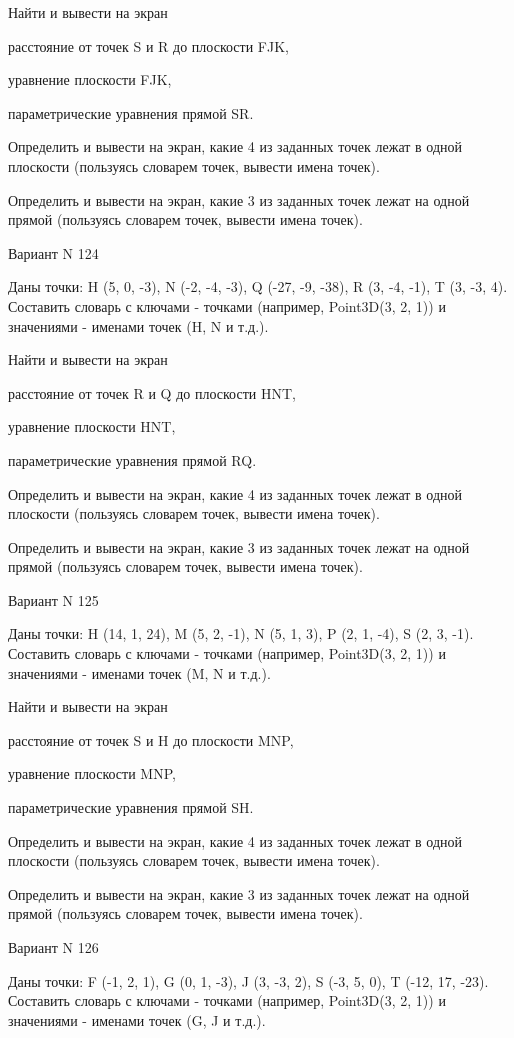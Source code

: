 \documentclass[11pt]{report}
\begin{document}
Найти и вывести на экран


расстояние от точек S и R до плоскости FJK,


уравнение плоскости FJK,


параметрические уравнения прямой SR.


Определить и вывести на экран, какие 4 из заданных точек лежат в одной плоскости (пользуясь словарем точек, вывести имена точек).


Определить и вывести на экран, какие 3 из заданных точек лежат на одной прямой (пользуясь словарем точек, вывести имена точек).

\newpage
Вариант N 124

Даны точки: H (5, 0, -3), N (-2, -4, -3), Q (-27, -9, -38), R (3, -4, -1), T (3, -3, 4).
Составить словарь с ключами - точками (например, Point3D(3, 2, 1)) и значениями - именами точек (H, N и т.д.).


Найти и вывести на экран


расстояние от точек R и Q до плоскости HNT,


уравнение плоскости HNT,


параметрические уравнения прямой RQ.


Определить и вывести на экран, какие 4 из заданных точек лежат в одной плоскости (пользуясь словарем точек, вывести имена точек).


Определить и вывести на экран, какие 3 из заданных точек лежат на одной прямой (пользуясь словарем точек, вывести имена точек).

\newpage
Вариант N 125

Даны точки: H (14, 1, 24), M (5, 2, -1), N (5, 1, 3), P (2, 1, -4), S (2, 3, -1).
Составить словарь с ключами - точками (например, Point3D(3, 2, 1)) и значениями - именами точек (M, N и т.д.).


Найти и вывести на экран


расстояние от точек S и H до плоскости MNP,


уравнение плоскости MNP,


параметрические уравнения прямой SH.


Определить и вывести на экран, какие 4 из заданных точек лежат в одной плоскости (пользуясь словарем точек, вывести имена точек).


Определить и вывести на экран, какие 3 из заданных точек лежат на одной прямой (пользуясь словарем точек, вывести имена точек).

\newpage
Вариант N 126

Даны точки: F (-1, 2, 1), G (0, 1, -3), J (3, -3, 2), S (-3, 5, 0), T (-12, 17, -23).
Составить словарь с ключами - точками (например, Point3D(3, 2, 1)) и значениями - именами точек (G, J и т.д.).
\end{document}
